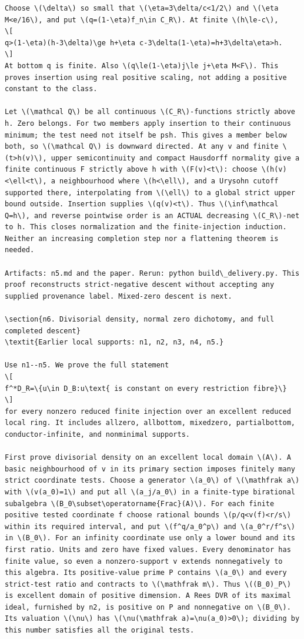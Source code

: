 \documentclass[11pt]{article}
\begin{document}
\begin{Verbatim}[fontsize=\tiny,breaklines=true,breakanywhere=true]
Choose \(\delta\) so small that \(\eta=3\delta/c<1/2\) and \(\eta M<e/16\), and put \(q=(1-\eta)f_n\in C_R\). At finite \(h\le-c\),
\[
q>(1-\eta)(h-3\delta)\ge h+\eta c-3\delta(1-\eta)=h+3\delta\eta>h.
\]
At bottom q is finite. Also \(q\le(1-\eta)j\le j+\eta M<F\). This proves insertion using real positive scaling, not adding a positive constant to the class.

Let \(\mathcal Q\) be all continuous \(C_R\)-functions strictly above h. Zero belongs. For two members apply insertion to their continuous minimum; the test need not itself be psh. This gives a member below both, so \(\mathcal Q\) is downward directed. At any v and finite \(t>h(v)\), upper semicontinuity and compact Hausdorff normality give a finite continuous F strictly above h with \(F(v)<t\): choose \(h(v)<\ell<t\), a neighbourhood where \(h<\ell\), and a Urysohn cutoff supported there, interpolating from \(\ell\) to a global strict upper bound outside. Insertion supplies \(q(v)<t\). Thus \(\inf\mathcal Q=h\), and reverse pointwise order is an ACTUAL decreasing \(C_R\)-net to h. This closes normalization and the finite-injection induction. Neither an increasing completion step nor a flattening theorem is needed.

Artifacts: n5.md and the paper. Rerun: python build\_delivery.py. This proof reconstructs strict-negative descent without accepting any supplied provenance label. Mixed-zero descent is next.

\section{n6. Divisorial density, normal zero dichotomy, and full completed descent}
\textit{Earlier local supports: n1, n2, n3, n4, n5.}

Use n1--n5. We prove the full statement
\[
f^*D_R=\{u\in D_B:u\text{ is constant on every restriction fibre}\}
\]
for every nonzero reduced finite injection over an excellent reduced local ring. It includes allzero, allbottom, mixedzero, partialbottom, conductor-infinite, and nonminimal supports.

First prove divisorial density on an excellent local domain \(A\). A basic neighbourhood of v in its primary section imposes finitely many strict coordinate tests. Choose a generator \(a_0\) of \(\mathfrak a\) with \(v(a_0)=1\) and put all \(a_j/a_0\) in a finite-type birational subalgebra \(B_0\subset\operatorname{Frac}(A)\). For each finite positive tested coordinate f choose rational bounds \(p/q<v(f)<r/s\) within its required interval, and put \(f^q/a_0^p\) and \(a_0^r/f^s\) in \(B_0\). For an infinity coordinate use only a lower bound and its first ratio. Units and zero have fixed values. Every denominator has finite value, so even a nonzero-support v extends nonnegatively to this algebra. Its positive-value prime P contains \(a_0\) and every strict-test ratio and contracts to \(\mathfrak m\). Thus \((B_0)_P\) is excellent domain of positive dimension. A Rees DVR of its maximal ideal, furnished by n2, is positive on P and nonnegative on \(B_0\). Its valuation \(\nu\) has \(\nu(\mathfrak a)=\nu(a_0)>0\); dividing by this number satisfies all the original tests.


\end{Verbatim}
\end{document}

